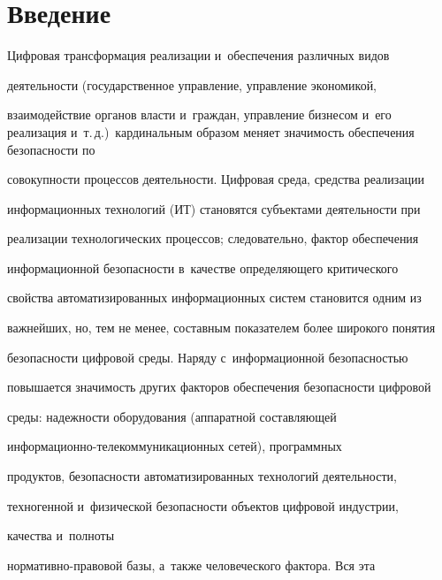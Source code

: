 




      \thispagestyle{headings}

      

    \vspace*{-13pt} 



\section{Введение}



  Цифровая трансформация реализации и~обеспечения различных видов 

деятельности (государственное управление, управ\-ле\-ние экономикой, 

взаимодействие органов власти и~граждан, управление бизнесом и~его реализация и~т.\,д.)\ кардинальным образом меняет значимость обеспечения безопас\-ности по 

совокупности процессов деятельности. Цифровая среда, средства реализации 

информационных технологий (ИТ) становятся субъектами деятельности при 

реализации технологических процессов; следовательно, фактор обеспечения 

информационной без\-опас\-ности в~качестве определяющего критического 

свойства автоматизированных информационных сис\-тем становится одним из 

важнейших, но, тем не менее, составным показателем более широкого понятия 

безопасности цифровой среды. Наряду с~информационной без\-опас\-ностью 

повышается значимость других факторов обеспечения без\-опас\-ности цифровой 

среды: надежности обору\-до\-ва\-ния (аппаратной составляющей  

ин\-фор\-ма\-ци\-он\-но-те\-ле\-ком\-му\-ни\-ка\-ци\-он\-ных сетей), программных 

продуктов, безопасности автоматизированных технологий деятельности, 

техногенной и~физической без\-опас\-ности объектов цифровой индустрии, 

качества и~полноты  

нор\-ма\-тив\-но-пра\-во\-вой базы, а~также человеческого фактора. Вся эта 

